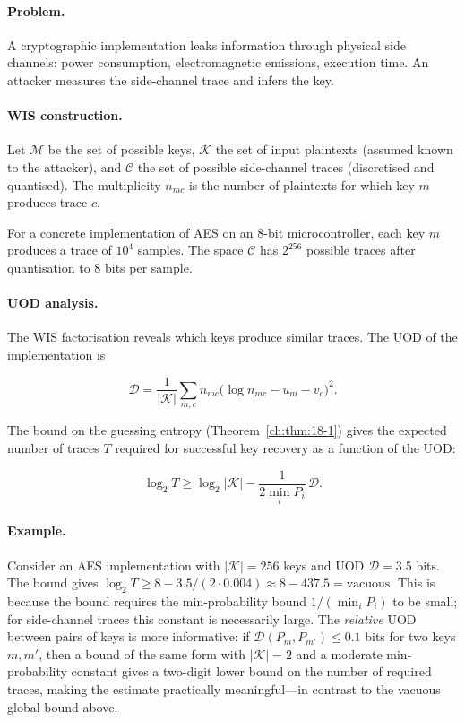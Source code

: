 \paragraph{Problem.}
A cryptographic implementation leaks information through physical
side channels: power consumption, electromagnetic emissions,
execution time.  An attacker measures the side-channel trace and
infers the key.

\paragraph{WIS construction.}
Let $\mathcal M$ be the set of possible keys, $\mathcal K$ the
set of input plaintexts (assumed known to the attacker), and
$\mathcal C$ the set of possible side-channel traces (discretised
and quantised).  The multiplicity $n_{mc}$ is the number of
plaintexts for which key $m$ produces trace $c$.

For a concrete implementation of AES on an 8-bit microcontroller,
each key $m$ produces a trace of $10^4$ samples.  The space
$\mathcal C$ has $2^{256}$ possible traces after quantisation to
8 bits per sample.

\paragraph{UOD analysis.}
The WIS factorisation reveals which keys produce similar traces.
The UOD of the implementation is

\[
\mathcal D = \frac{1}{|\mathcal K|}\sum_{m,c}
n_{mc}\bigl(\log n_{mc} - u_m - v_c\bigr)^2.
\]

The bound on the guessing entropy (Theorem~\ref{ch:thm:18-1}) gives the
expected number of traces $T$ required for successful key
recovery as a function of the UOD:

\[
\log_2 T \ge \log_2|\mathcal K| - \frac{1}{2\min_i P_i}\,\mathcal D.
\]

\paragraph{Example.}
Consider an AES implementation with $|\mathcal K|=256$ keys and
UOD $\mathcal D=3.5$ bits.  The bound gives
$\log_2 T \ge 8 - 3.5/(2\cdot0.004) \approx 8 - 437.5 = \text{vacuous}$.
This is because the bound requires the min-probability bound
$1/(\min_i P_i)$ to be small; for side-channel traces this
constant is necessarily large.  The {\it relative} UOD between
pairs of keys is more informative: if $\mathcal D(P_{m},P_{m'})\le0.1$
bits for two keys $m,m'$, then a bound of the same form with
$|\mathcal K|=2$ and a moderate min-probability constant gives a
two-digit lower bound on the number of required traces, making the
estimate practically meaningful---in contrast to the vacuous global
bound above.

